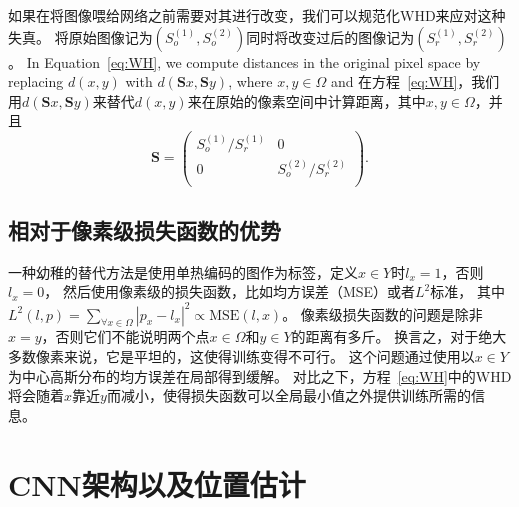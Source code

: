 \documentclass[10pt,twocolumn,letterpaper,UTF8]{article}
\begin{document}
如果在将图像喂给网络之前需要对其进行改变，我们可以规范化WHD来应对这种失真。
将原始图像记为$(S_o^{(1)}, S_o^{(2)})$同时将改变过后的图像记为$(S_r^{(1)}, S_r^{(2)})$。
In Equation~\eqref{eq:WH}, we compute distances in the original pixel space by replacing $d(x, y)$ with $d(\textbf{S} x, \textbf{S} y)$, where $x, y \in \Omega$ and 
在方程~\eqref{eq:WH}，我们用$d(\textbf{S} x, \textbf{S} y)$来替代$d(x, y)$来在原始的像素空间中计算距离，其中$x, y \in \Omega$，并且
\begin{equation}
  \label{eq:normaliz}
    \textbf{S} = 
        \begin{pmatrix}
            S_o^{(1)} / S_r^{(1)}   &     0     \\
            0                             &     S_o^{(2)} / S_r^{(2)}  \\
        \end{pmatrix} .
\end{equation}


\subsection{相对于像素级损失函数的优势}
一种幼稚的替代方法是使用单热编码的图作为标签，定义$x \in Y$时$l_x = 1$，否则$l_x = 0$，
然后使用像素级的损失函数，比如均方误差（MSE）或者$L^2$标准，
其中$L^2(l, p) = \sum_{\forall x \in \Omega} |p_x - l_x|^2 \propto \text{MSE}(l, x)$。
像素级损失函数的问题是除非$x = y$，否则它们不能说明两个点$x\in \Omega$和$y\in Y$的距离有多斤。
换言之，对于绝大多数像素来说，它是平坦的，这使得训练变得不可行。
这个问题通过使用以$x\in Y$为中心高斯分布的均方误差在局部得到缓解\cite{tompson2015efficient}。
对比之下，方程~\eqref{eq:WH}中的WHD将会随着$x$靠近$y$而减小，使得损失函数可以全局最小值之外提供训练所需的信息。

\section{CNN架构以及位置估计}
\label{sec:cnn}
\end{document}
